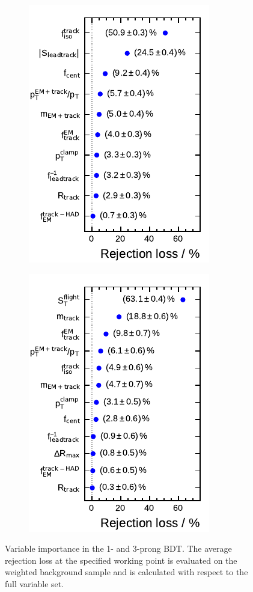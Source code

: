\begin{figure}[htb]
  \centering
  \begin{subfigure}[t]{0.48\textwidth}
    \centering
    \includegraphics{./figures/bdt_perf/var_importance/1p_iter1.pdf}
  \end{subfigure}\hfill
  \begin{subfigure}[t]{0.48\textwidth}
    \centering
    \includegraphics{./figures/bdt_perf/var_importance/3p_iter1.pdf}
  \end{subfigure}
  \caption{Variable importance in the 1- and 3-prong BDT. The average rejection
    loss at the specified working point is evaluated on the weighted background
    sample and is calculated with respect to the full variable set. }
  \label{fig:variable_importance}
\end{figure}

